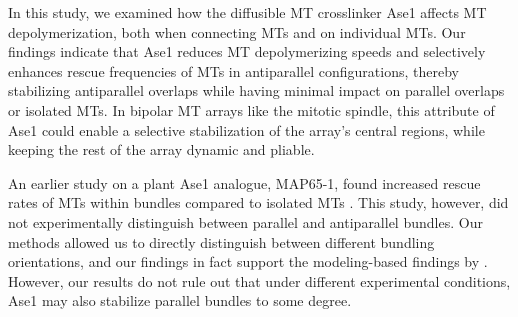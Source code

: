 In this study, we examined how the diffusible MT crosslinker Ase1 affects MT depolymerization, both when connecting MTs and on individual MTs. Our findings indicate that Ase1 reduces MT depolymerizing speeds and selectively enhances rescue frequencies of MTs in antiparallel configurations, thereby stabilizing antiparallel overlaps while having minimal impact on parallel overlaps or isolated MTs. In bipolar MT arrays like the mitotic spindle, this attribute of Ase1 could enable a selective stabilization of the array's central regions, while keeping the rest of the array dynamic and pliable.\par


An earlier study on a plant Ase1 analogue, MAP65-1, found increased rescue rates of MTs within bundles compared to isolated MTs \parencite{Stoppin-Mellet2013}. This study, however, did not experimentally distinguish between parallel and antiparallel bundles. Our methods allowed us to directly distinguish between different bundling orientations, and our findings in fact support the modeling-based findings by \parencite{Stoppin-Mellet2013}. However, our results do not rule out that under different experimental conditions, Ase1 may also stabilize parallel bundles to some degree.\par

